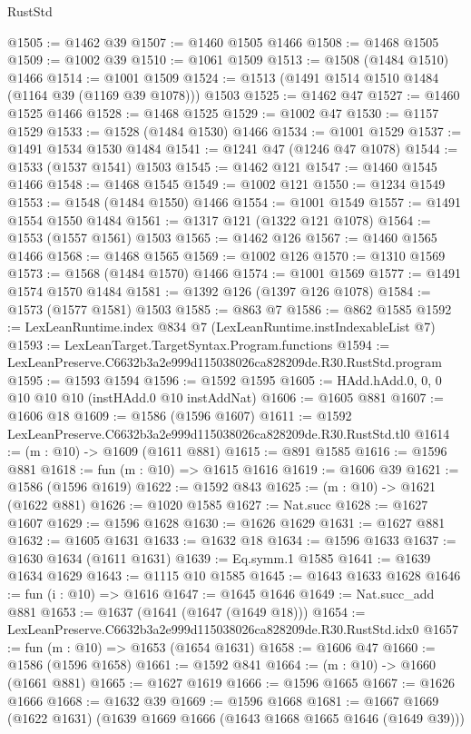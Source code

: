 \begin{lexlean}{RustStd}
\begin{coremodule}
@1505 := @1462 @39
@1507 := @1460 @1505 @1466
@1508 := @1468 @1505
@1509 := @1002 @39
@1510 := @1061 @1509
@1513 := @1508 (@1484 @1510) @1466
@1514 := @1001 @1509
@1524 := @1513 (@1491 @1514 @1510 @1484 (@1164 @39 (@1169 @39 @1078))) @1503
@1525 := @1462 @47
@1527 := @1460 @1525 @1466
@1528 := @1468 @1525
@1529 := @1002 @47
@1530 := @1157 @1529
@1533 := @1528 (@1484 @1530) @1466
@1534 := @1001 @1529
@1537 := @1491 @1534 @1530 @1484
@1541 := @1241 @47 (@1246 @47 @1078)
@1544 := @1533 (@1537 @1541) @1503
@1545 := @1462 @121
@1547 := @1460 @1545 @1466
@1548 := @1468 @1545
@1549 := @1002 @121
@1550 := @1234 @1549
@1553 := @1548 (@1484 @1550) @1466
@1554 := @1001 @1549
@1557 := @1491 @1554 @1550 @1484
@1561 := @1317 @121 (@1322 @121 @1078)
@1564 := @1553 (@1557 @1561) @1503
@1565 := @1462 @126
@1567 := @1460 @1565 @1466
@1568 := @1468 @1565
@1569 := @1002 @126
@1570 := @1310 @1569
@1573 := @1568 (@1484 @1570) @1466
@1574 := @1001 @1569
@1577 := @1491 @1574 @1570 @1484
@1581 := @1392 @126 (@1397 @126 @1078)
@1584 := @1573 (@1577 @1581) @1503
@1585 := @863 @7
@1586 := @862 @1585
@1592 := LexLeanRuntime.index @834 @7 (LexLeanRuntime.instIndexableList @7)
@1593 := LexLeanTarget.TargetSyntax.Program.functions
@1594 := LexLeanPreserve.C6632b3a2e999d115038026ca828209de.R30.RustStd.program
@1595 := @1593 @1594
@1596 := @1592 @1595
@1605 := HAdd.hAdd.{0, 0, 0} @10 @10 @10 (instHAdd.{0} @10 instAddNat)
@1606 := @1605 @881
@1607 := @1606 @18
@1609 := @1586 (@1596 @1607)
@1611 := @1592 LexLeanPreserve.C6632b3a2e999d115038026ca828209de.R30.RustStd.tl0
@1614 := (m : @10) -> @1609 (@1611 @881)
@1615 := @891 @1585
@1616 := @1596 @881
@1618 := fun (m : @10) => @1615 @1616
@1619 := @1606 @39
@1621 := @1586 (@1596 @1619)
@1622 := @1592 @843
@1625 := (m : @10) -> @1621 (@1622 @881)
@1626 := @1020 @1585
@1627 := Nat.succ
@1628 := @1627 @1607
@1629 := @1596 @1628
@1630 := @1626 @1629
@1631 := @1627 @881
@1632 := @1605 @1631
@1633 := @1632 @18
@1634 := @1596 @1633
@1637 := @1630 @1634 (@1611 @1631)
@1639 := Eq.symm.{1} @1585
@1641 := @1639 @1634 @1629
@1643 := @1115 @10 @1585
@1645 := @1643 @1633 @1628
@1646 := fun (i : @10) => @1616
@1647 := @1645 @1646
@1649 := Nat.succ_add @881
@1653 := @1637 (@1641 (@1647 (@1649 @18)))
@1654 := LexLeanPreserve.C6632b3a2e999d115038026ca828209de.R30.RustStd.idx0
@1657 := fun (m : @10) => @1653 (@1654 @1631)
@1658 := @1606 @47
@1660 := @1586 (@1596 @1658)
@1661 := @1592 @841
@1664 := (m : @10) -> @1660 (@1661 @881)
@1665 := @1627 @1619
@1666 := @1596 @1665
@1667 := @1626 @1666
@1668 := @1632 @39
@1669 := @1596 @1668
@1681 := @1667 @1669 (@1622 @1631) (@1639 @1669 @1666 (@1643 @1668 @1665 @1646 (@1649 @39)))

\end{coremodule}
\end{lexlean}
